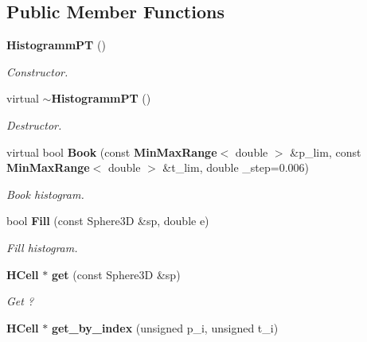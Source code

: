 \subsection*{Public Member Functions}
\begin{DoxyCompactItemize}
\item 
{\bf HistogrammPT} ()\label{classHistogrammPT_a5eb56dc8f443470d3f2e64261adfcf68}

\begin{DoxyCompactList}\small\item\em Constructor. \item\end{DoxyCompactList}\item 
virtual {\bf $\sim$HistogrammPT} ()\label{classHistogrammPT_a919d7136a094d78a3160f82796ddc390}

\begin{DoxyCompactList}\small\item\em Destructor. \item\end{DoxyCompactList}\item 
virtual bool {\bf Book} (const {\bf MinMaxRange}$<$ double $>$ \&p\_\-lim, const {\bf MinMaxRange}$<$ double $>$ \&t\_\-lim, double \_\-step=0.006)\label{classHistogrammPT_a9f55c84ff9433921ad550901d77a40ce}

\begin{DoxyCompactList}\small\item\em Book histogram. \item\end{DoxyCompactList}\item 
bool {\bf Fill} (const Sphere3D \&sp, double e)\label{classHistogrammPT_a6f2b6c655ae17e89360f57de164c6e67}

\begin{DoxyCompactList}\small\item\em Fill histogram. \item\end{DoxyCompactList}\item 
{\bf HCell} $\ast$ {\bf get} (const Sphere3D \&sp)\label{classHistogrammPT_afde466a0d65f230d96919bdccce12042}

\begin{DoxyCompactList}\small\item\em Get ? \item\end{DoxyCompactList}\item 
{\bf HCell} $\ast$ {\bf get\_\-by\_\-index} (unsigned p\_\-i, unsigned t\_\-i)\label{classHistogrammPT_ab553651b0281a37e947f6326e72f05bf}


\end{DoxyCompactItemize}
